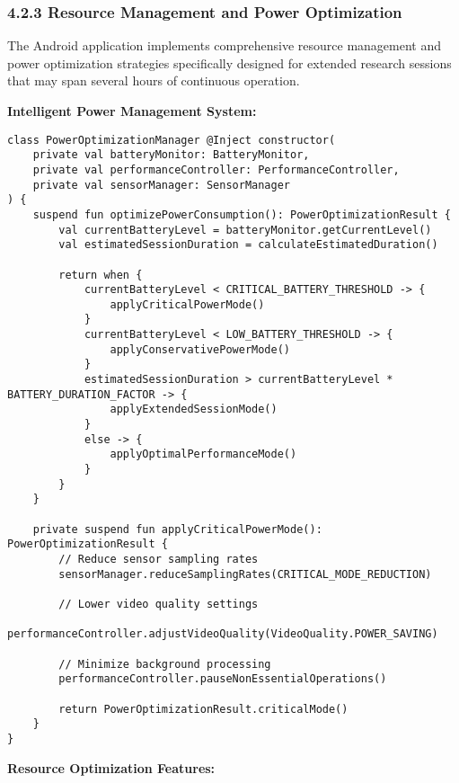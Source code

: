 \documentclass[12pt,a4paper]{article}
\begin{document}
\subsubsection{4.2.3 Resource Management and Power Optimization}

The Android application implements comprehensive resource management and power optimization strategies specifically
designed for extended research sessions that may span several hours of continuous operation.

\textbf{Intelligent Power Management System:}

\begin{verbatim}
class PowerOptimizationManager @Inject constructor(
    private val batteryMonitor: BatteryMonitor,
    private val performanceController: PerformanceController,
    private val sensorManager: SensorManager
) {
    suspend fun optimizePowerConsumption(): PowerOptimizationResult {
        val currentBatteryLevel = batteryMonitor.getCurrentLevel()
        val estimatedSessionDuration = calculateEstimatedDuration()
        
        return when {
            currentBatteryLevel < CRITICAL_BATTERY_THRESHOLD -> {
                applyCriticalPowerMode()
            }
            currentBatteryLevel < LOW_BATTERY_THRESHOLD -> {
                applyConservativePowerMode()
            }
            estimatedSessionDuration > currentBatteryLevel * BATTERY_DURATION_FACTOR -> {
                applyExtendedSessionMode()
            }
            else -> {
                applyOptimalPerformanceMode()
            }
        }
    }
    
    private suspend fun applyCriticalPowerMode(): PowerOptimizationResult {
        // Reduce sensor sampling rates
        sensorManager.reduceSamplingRates(CRITICAL_MODE_REDUCTION)
        
        // Lower video quality settings
        performanceController.adjustVideoQuality(VideoQuality.POWER_SAVING)
        
        // Minimize background processing
        performanceController.pauseNonEssentialOperations()
        
        return PowerOptimizationResult.criticalMode()
    }
}
\end{verbatim}

\textbf{Resource Optimization Features:}
\end{document}
